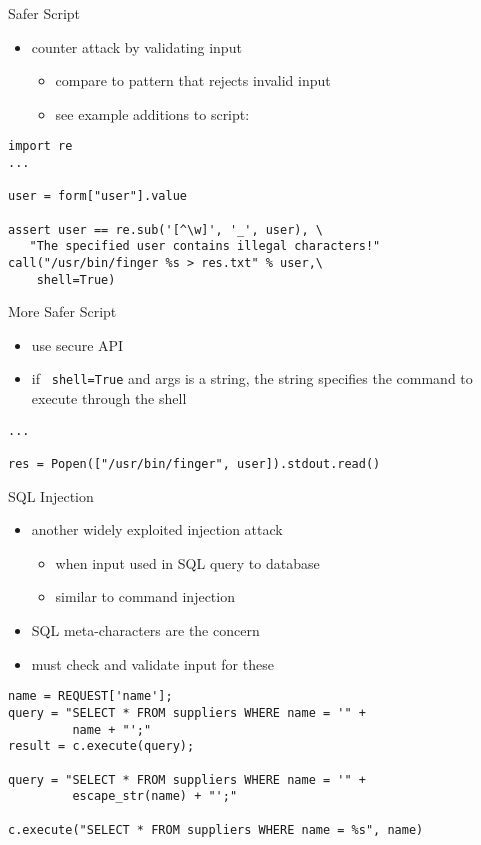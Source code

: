 \documentclass{beamer}
\begin{document}
\begin{frame}[fragile]{Safer Script}
  \begin{itemize}
  \item counter attack by validating input
    \begin{itemize}
    \item compare to pattern that rejects invalid input
    \item see example additions to script: 
    \end{itemize}
  \end{itemize}

  \begin{verbatim}
import re
...

user = form["user"].value

assert user == re.sub('[^\w]', '_', user), \
   "The specified user contains illegal characters!"
call("/usr/bin/finger %s > res.txt" % user,\
    shell=True)
  \end{verbatim}
\end{frame}

\begin{frame}[fragile]{More Safer Script}
  \begin{itemize}
  \item use secure API
  \item if \verb| shell=True| and args is a string, the string specifies the command to execute through the shell
  \end{itemize}

  \begin{verbatim}
...

res = Popen(["/usr/bin/finger", user]).stdout.read()
  \end{verbatim}
\end{frame}

\begin{frame}[fragile]{SQL Injection}
  \begin{itemize}
  \item another widely exploited injection attack
    \begin{itemize}
    \item when input used in SQL query to database
    \item similar to command injection
    \end{itemize}
  \item SQL meta-characters are the concern
  \item must check and validate input for these
  \end{itemize}

  \begin{verbatim}
name = REQUEST['name'];
query = "SELECT * FROM suppliers WHERE name = '" +
         name + "';"
result = c.execute(query);

query = "SELECT * FROM suppliers WHERE name = '" +
         escape_str(name) + "';"

c.execute("SELECT * FROM suppliers WHERE name = %s", name)
  \end{verbatim}
\end{frame}
\end{document}
